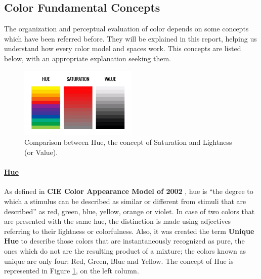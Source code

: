 \documentclass{report}
\begin{document}
\subsection{Color Fundamental Concepts}
The organization and perceptual evaluation of color depends on some concepts which have been referred
before. They will be explained in this report, helping us understand how every color model and spaces work.
This concepts are listed below, with an appropriate explanation seeking them.
%
%
\begin{figure}[H]
  \centering
  \vspace{-10pt}
  \includegraphics[width=0.5\textwidth]{Hue_Saturation_value.png}
  \caption[Hue, Saturation and Value Comparison]{Comparison between Hue, the concept of Saturation and Lightness (or Value).\protect\footnotemark{}}
  \vspace{-25pt}
  \label{fig:hsvconcepts}
\end{figure}
%
\paragraph{\underline{Hue}} As defined in \textbf{CIE Color Appearance Model of 2002} \cite{Moroney2002}, hue is
“the degree to which a stimulus can be described as similar or different from stimuli that are described”
as red, green, blue, yellow, orange or violet. In case of two colors that are presented with the same hue, the
distinction is made using adjectives referring to their lightness or colorfulness. Also, it was created the
term \textbf{Unique Hue} to describe those colors that are instantaneously recognized as pure, the ones which do 
not are the resulting product of a mixture; the colors known as unique are only four: Red, Green, Blue
and Yellow. The concept of Hue is represented in Figure \ref{fig:hsvconcepts}, on the left column.
%
\end{document}
